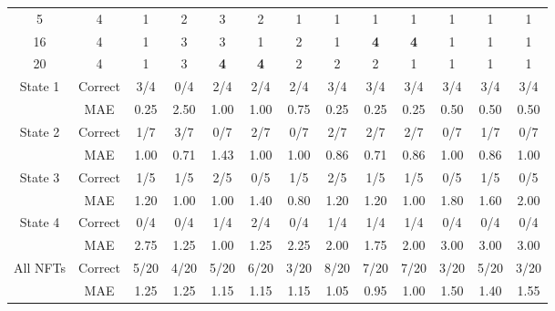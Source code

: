 \documentclass[12pt,reqno]{amsart}
\begin{document}
\begin{landscape}
\begin{adjustbox}{max totalsize={\linewidth}{0.95\vsize},center}
\begin{minipage}{\linewidth}
\begin{tabular}{@{}cc*{11}{c}@{}}
5 & 4
& 1 & 2 & 3 & 2 & 1 & 1 & 1 & 1 & 1 & 1 & 1 \\

16 & 4
& 1 & 3 & 3 & 1 & 2 & 1
& \textcolor{goodblue}{\bfseries 4}
& \textcolor{goodblue}{\bfseries 4}
& 1 & 1 & 1 \\

20 & 4
& 1 & 3
& \textcolor{goodblue}{\bfseries 4}
& \textcolor{goodblue}{\bfseries 4}
& 2
& 2 & 2 & 1 & 1 & 1 & 1 \\

\midrule

State 1 & Correct
& 3/4 & 0/4 & 2/4 & 2/4 & 2/4 & 3/4 & 3/4 & 3/4 & 3/4 & 3/4 & 3/4 \\
& MAE
& 0.25 & 2.50 & 1.00 & 1.00 & 0.75 & 0.25 & 0.25 & 0.25 & 0.50 & 0.50 & 0.50 \\

\addlinespace[1pt]

State 2 & Correct
& 1/7 & 3/7 & 0/7 & 2/7 & 0/7 & 2/7 & 2/7 & 2/7 & 0/7 & 1/7 & 0/7 \\
& MAE
& 1.00 & 0.71 & 1.43 & 1.00 & 1.00 & 0.86 & 0.71 & 0.86 & 1.00 & 0.86 & 1.00 \\

\addlinespace[1pt]

State 3 & Correct
& 1/5 & 1/5 & 2/5 & 0/5 & 1/5 & 2/5 & 1/5 & 1/5 & 0/5 & 1/5 & 0/5 \\
& MAE
& 1.20 & 1.00 & 1.00 & 1.40 & 0.80 & 1.20 & 1.20 & 1.00 & 1.80 & 1.60 & 2.00 \\

\addlinespace[1pt]

State 4 & Correct
& 0/4 & 0/4 & 1/4 & 2/4 & 0/4 & 1/4 & 1/4 & 1/4 & 0/4 & 0/4 & 0/4 \\
& MAE
& 2.75 & 1.25 & 1.00 & 1.25 & 2.25 & 2.00 & 1.75 & 2.00 & 3.00 & 3.00 & 3.00 \\

\midrule

All NFTs & Correct
& 5/20 & 4/20 & 5/20 & 6/20 & 3/20 & 8/20 & 7/20 & 7/20 & 3/20 & 5/20 & 3/20 \\
& MAE
& 1.25 & 1.25 & 1.15 & 1.15 & 1.15 & 1.05 & 0.95 & 1.00 & 1.50 & 1.40 & 1.55 \\

\bottomrule
\end{tabular}
\par
\endgroup


\end{minipage}
\end{adjustbox}
\end{landscape}
\end{document}

